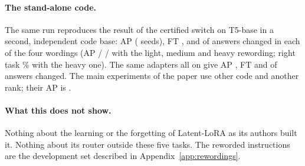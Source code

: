\paragraph{The stand-alone code.} The same run reproduces the result of the certified switch on T5-base in a
second, independent code base: AP \LatentCertAP{} (\LatentSeeds{} seeds), FT \LatentCertFT{}, and
\LatentCertChanged{} of \LatentCompared{} answers changed in each of the four wordings (AP
\LatentCertAPLight{} / \LatentCertAPMedium{} / \LatentCertAPHeavy{} with the light, medium and heavy
rewording; right task \LatentCertRightHeavy{}\% with the heavy one). The same adapters all on give AP
\LatentAllAP{}, FT \LatentAllFT{} and \LatentAllChanged{} of \LatentCompared{} answers changed. The main
experiments of the paper use other code and another rank; their AP is \FiveCertAP{}.

\paragraph{What this does not show.} Nothing about the learning or the forgetting of Latent-LoRA as
its authors built it. Nothing about its router outside these five tasks. The reworded instructions
are the development set described in Appendix~\ref{app:rewordings}.
